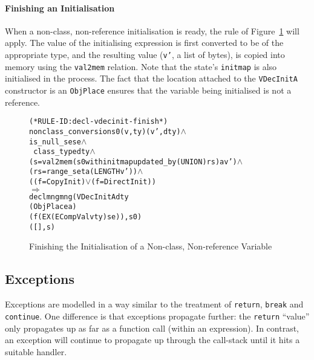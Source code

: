 \documentclass[11pt]{article}
\begin{document}
\paragraph{Finishing an Initialisation}
When a non-class, non-reference initialisation is ready, the rule
 of Figure~\ref{fig:decl-vdecinit-finish}
will apply.  The value of the initialising expression is first
converted to be of the appropriate type, and the resulting value
(\texttt{v'}, a list of bytes), is copied into memory using the
\texttt{val2mem} relation.  Note that
the state's \texttt{initmap} is also initialised in the
process.  The fact that the location attached to the
\texttt{VDecInitA} constructor is an \texttt{ObjPlace} ensures that
the variable being initialised is not a reference.%
%
\begin{figure}
\begin{minipage}{\textwidth}
%
%
\begin{alltt}
(* RULE-ID: decl-vdecinit-finish *)
     nonclass_conversion s0 (v,ty) (v',dty) \(\land\)
     is_null_se se \(\land\)
     ~class_type dty \(\land\)
     (s = val2mem (s0 with initmap updated_by (UNION) rs) a v') \(\land\)
     (rs = range_set a (LENGTH v')) \(\land\)
     ((f = CopyInit) \(\lor\) (f = DirectInit))
   \(\Rightarrow\)
     declmng mng (VDecInitA dty
                            (ObjPlace a)
                            (f (EX (ECompVal v ty) se)), s0)
                 ([], s)
\end{alltt}
\end{minipage}
\caption{Finishing the Initialisation of a Non-class, Non-reference
  Variable}
\label{fig:decl-vdecinit-finish}
\end{figure}

\subsection{Exceptions}
\label{sec:exceptions}

Exceptions are modelled in a way similar to the treatment of
\texttt{return}, \texttt{break} and \texttt{continue}.  One difference
is that exceptions propagate further: the \texttt{return} ``value''
only propagates up as far as a function call (within an expression).
In contrast, an exception will continue to propagate up through the
call-stack until it hits a suitable handler.
\end{document}
